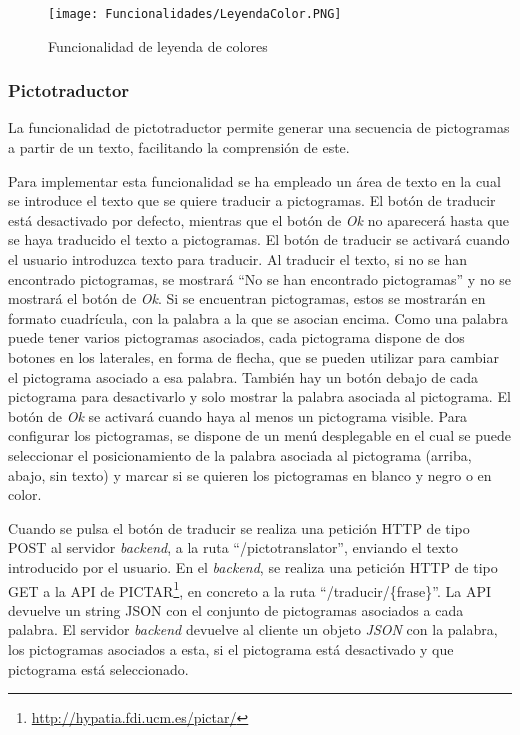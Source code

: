\begin{figure}[ht!]
  \centering
  \texttt{[image: Funcionalidades/LeyendaColor.PNG]}
  \caption{Funcionalidad de leyenda de colores}
  \label{fig:leyendacolor}
\end{figure}

\subsubsection{Pictotraductor}
\label{sec:imppictotraductor}
La funcionalidad de pictotraductor permite generar una secuencia de pictogramas a partir de un texto, facilitando la comprensión de este.

Para implementar esta funcionalidad se ha empleado un área de texto en la cual se introduce el texto que se quiere traducir a pictogramas. El botón de traducir está desactivado por defecto, mientras que el botón de \textit{Ok} no aparecerá hasta que se haya traducido el texto a pictogramas. El botón de traducir se activará cuando el usuario introduzca texto para traducir. Al traducir el texto, si no se han encontrado pictogramas, se mostrará ``No se han encontrado pictogramas'' y no se mostrará el botón de \textit{Ok}. Si se encuentran pictogramas, estos se mostrarán en formato cuadrícula, con la palabra a la que se asocian encima. Como una palabra puede tener varios pictogramas asociados, cada pictograma dispone de dos botones en los laterales, en forma de flecha, que se pueden utilizar para cambiar el pictograma asociado a esa palabra. También hay un botón debajo de cada pictograma para desactivarlo y solo mostrar la palabra asociada al pictograma. El botón de \textit{Ok} se activará cuando haya al menos un pictograma visible. Para configurar los pictogramas, se dispone de un menú desplegable en el cual se puede seleccionar el posicionamiento de la palabra asociada al pictograma (arriba, abajo, sin texto) y marcar si se quieren los pictogramas en blanco y negro o en color.

Cuando se pulsa el botón de traducir se realiza una petición HTTP de tipo POST al servidor \textit{backend}, a la ruta ``/pictotranslator'', enviando el texto introducido por el usuario. En el \textit{backend}, se realiza una petición HTTP de tipo GET a la API de PICTAR\footnote{\url{http://hypatia.fdi.ucm.es/pictar/}}, en concreto a la ruta ``/traducir/\{frase\}''. La API devuelve un string JSON con el conjunto de pictogramas asociados a cada palabra. El servidor \textit{backend} devuelve al cliente un objeto \textit{JSON} con la palabra, los pictogramas asociados a esta, si el pictograma está desactivado y que pictograma está seleccionado.

